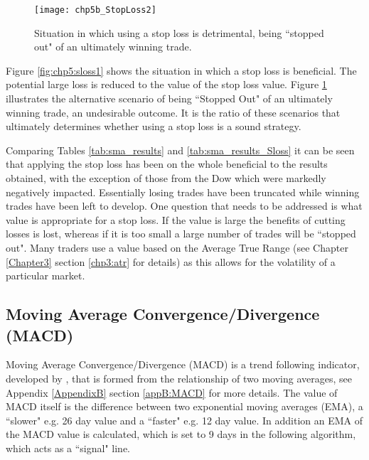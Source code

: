 \begin{figure}[tbph]
\centering
\texttt{[image: chp5b\_StopLoss2]}
\caption[Situation in which using a stop loss is detrimental]{Situation in which using a stop loss is detrimental, being \textquotedblleft stopped out" of an ultimately winning trade.}
\label{fig:chp5:sloss2}
\end{figure}

Figure \ref{fig:chp5:sloss1} shows the situation in which a stop loss is beneficial. The potential large loss is reduced to the value of the stop loss value. Figure \ref{fig:chp5:sloss2} illustrates the alternative scenario of being \textquotedblleft Stopped Out" of an ultimately winning trade, an undesirable outcome. It is the ratio of these scenarios that ultimately determines whether using a stop loss is a sound strategy.



Comparing Tables \ref{tab:sma_results} and \ref{tab:sma_results_Sloss}
it can be seen that applying the stop loss has been on the whole beneficial to the results obtained, with the exception of those from the Dow which were markedly negatively impacted. Essentially losing trades have been truncated while winning trades have been left to develop. One question that needs to be addressed is what value is appropriate for a stop loss. If the value is large the benefits of cutting losses is lost, whereas if it is too small a large number of trades will be \textquotedblleft stopped out". Many traders use a value based on the Average True Range (see Chapter \ref{Chapter3} section \ref{chp3:atr} for details) as this allows for the volatility of a particular market.

\subsection{Moving Average Convergence/Divergence (MACD)}

Moving Average Convergence/Divergence (MACD) is a trend following indicator, developed by \cite{appel2005technical}, that is formed from the relationship of two moving averages, see Appendix \ref{AppendixB} section \ref{appB:MACD} for more details. The value of MACD itself is the difference between two exponential moving averages (EMA), a \textquotedblleft slower" e.g. 26 day value and a \textquotedblleft faster" e.g. 12 day value. In addition an EMA of the MACD value is calculated, which is set to 9 days in the following algorithm, which acts as a \textquotedblleft signal" line.
 

